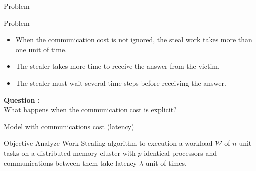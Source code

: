 \documentclass{beamer}
\begin{document}
\begin{frame}{Problem}
    \begin{alertblock}{Problem}
        \begin{itemize}
            \item When the communication cost is not ignored, the steal work takes more than one unit of time. \\
            \item The stealer takes more time to receive the answer from the victim. 
            \item The stealer must wait several time steps before receiving the answer. 
        \end{itemize}
    \end{alertblock}
    \textbf{Question :}
    \\
        What happens when the communication cost is explicit?
\end{frame} 


\begin{frame}{Model with communications cost (latency)}
    \begin{alertblock}{Objective}
       Analyze \alert{Work Stealing} algorithm to execution a workload $\mathcal{W}$ of $n$ unit tasks on a distributed-memory cluster with $p$ identical processors and communications between them take \alert{latency $\lambda$} unit of times.
    \end{alertblock}
\end{frame}
\end{document}
